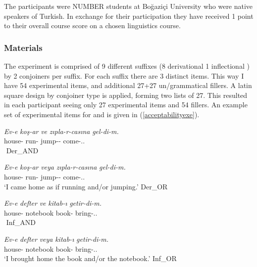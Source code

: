 The participants were NUMBER students at Boğaziçi University who were native speakers of Turkish. In exchange for their participation they have received 1 point to their overall course score on a chosen linguistics course.

\subsubsection{Materials}

The experiment is comprised of 9 different suffixes (8 derivational 1 inflectional {\Acc}) by 2 conjoiners per suffix. For each suffix there are 3 distinct items. This way I have 54 experimental items, and additional 27+27 un/grammatical fillers. A latin square design by conjoiner type is applied, forming two lists of 27. This resulted in each participant seeing only 27 experimental items and 54 fillers. An example set of experimental items for {\Acc} and {\Casina} is given in (\ref{acceptabilityexe}).

\begin{exe}
    \ex \label{acceptabilityexe}
    \begin{xlist}
    \ex \gll \textit{Ev-e} \textit{koş-ar} \textit{ve} \textit{zıpla-r-casına} \textit{gel-di-m.} \\ house-{\Dat} run-{\Aor} {\And} jump-{\Aor}-{\Casina} come-{\Pst}.{\First}.{\Sg} \\
    \glt ${}$ \hfill Der\_AND

    \ex \gll \textit{Ev-e} \textit{koş-ar} \textit{veya} \textit{zıpla-r-casına} \textit{gel-di-m.} \\ house-{\Dat} run-{\Aor} {\Or} jump-{\Aor}-{\Casina} come-{\Pst}.{\First}.{\Sg} \\
    \glt `I came home as if running and/or jumping.' \hfill Der\_OR
 
    \ex \gll \textit{Ev-e} \textit{defter} \textit{ve} \textit{kitab-ı} \textit{getir-di-m.} \\ house-{\Dat} notebook {\And} book-{\Acc} bring-{\Pst}.{\First}.{\Sg} \\
    \glt ${}$ \hfill Inf\_AND
    
    \ex \gll \textit{Ev-e} \textit{defter} \textit{veya} \textit{kitab-ı} \textit{getir-di-m.} \\ house-{\Dat} notebook {\Or} book-{\Acc} bring-{\Pst}.{\First}.{\Sg} \\
    \glt `I brought home the book and/or the notebook.' \hfill Inf\_OR
    \end{xlist}
\end{exe}

